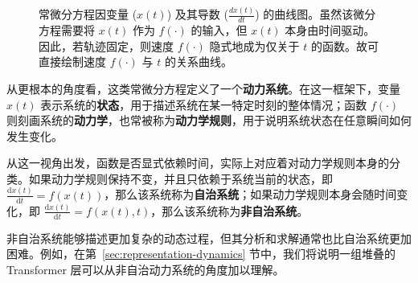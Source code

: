 \begin{figure}[!t]
\centering
{}
\caption{常微分方程因变量 ($x(t)$) 及其导数 ($\frac{d x(t)}{d t}$) 的曲线图。虽然该微分方程需要将 $x(t)$ 作为 $f(\cdot)$ 的输入，但 $x(t)$ 本身由时间驱动。因此，若轨迹固定，则速度 $f(\cdot)$ 隐式地成为仅关于 $t$ 的函数。故可直接绘制速度 $f(\cdot)$ 与 $t$ 的关系曲线。}
\label{fig:curve-of-an-ode}
\end{figure}

从更根本的角度看，这类常微分方程定义了一个\textbf{动力系统}。在这一框架下，变量 \(x(t)\) 表示系统的\textbf{状态}，用于描述系统在某一特定时刻的整体情况；函数 \(f(\cdot)\) 则刻画系统的\textbf{动力学}，也常被称为\textbf{动力学规则}，用于说明系统状态在任意瞬间如何发生变化。

从这一视角出发，函数是否显式依赖时间，实际上对应着对动力学规则本身的分类。如果动力学规则保持不变，并且只依赖于系统当前的状态，即 \(\frac{\mathrm{d}x(t)}{\mathrm{d}t}=f(x(t))\)，那么该系统称为\textbf{自治系统}；如果动力学规则本身会随时间变化，即 \(\frac{\mathrm{d}x(t)}{\mathrm{d}t}=f(x(t),t)\)，那么该系统称为\textbf{非自治系统}。

非自治系统能够描述更加复杂的动态过程，但其分析和求解通常也比自治系统更加困难。例如，在第~\ref{sec:representation-dynamics} 节中，我们将说明一组堆叠的 Transformer 层可以从非自治动力系统的角度加以理解。

